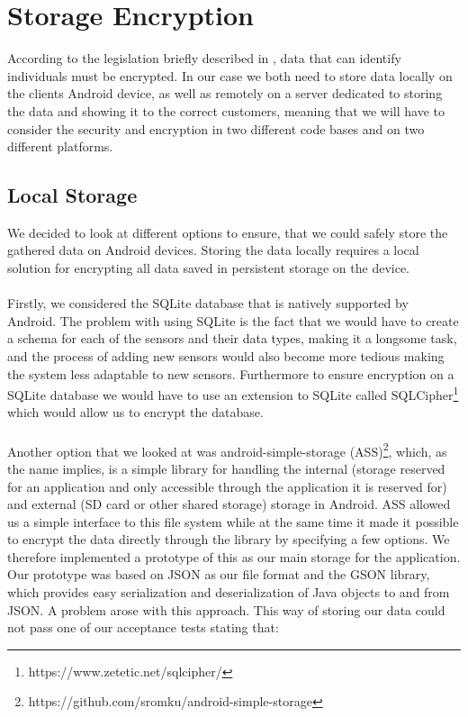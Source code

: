 
\section{Storage Encryption}
\label{sec:storage_encryption}
According to the legislation briefly described in , data that can identify individuals must be encrypted. In our case we both need to store data locally on the clients Android device, as well as remotely on a server dedicated to storing the data and showing it to the correct customers, meaning that we will have to consider the security and encryption in two different code bases and on two different platforms. 

\subsection{Local Storage}
\label{sub:local_storage}
We decided to look at different options to ensure, that we could safely store the gathered data on Android devices. Storing the data locally requires a local solution for encrypting all data saved in persistent storage on the device. 
\\\\
Firstly, we considered the SQLite database that is natively supported by Android. The problem with using SQLite is the fact that we would have to create a schema for each of the sensors and their data types, making it a longsome task, and the process of adding new sensors would also become more tedious making the system less adaptable to new sensors. Furthermore to ensure encryption on a SQLite database we would have to use an extension to SQLite called SQLCipher\footnote{https://www.zetetic.net/sqlcipher/} which would allow us to encrypt the database. 
\\\\
Another option that we looked at was android-simple-storage (ASS)\footnote{https://github.com/sromku/android-simple-storage}, which, as the name implies, is a simple library for handling the internal (storage reserved for an application and only accessible through the application it is reserved for) and external (SD card or other shared storage) storage in Android. ASS allowed us a simple interface to this file system while at the same time it made it possible to encrypt the data directly through the library by specifying a few options. We therefore implemented a prototype of this as our main storage for the application. Our prototype was based on JSON as our file format and the GSON library, which provides easy serialization and deserialization of Java objects to and from JSON. A problem arose with this approach. This way of storing our data could not pass one of our acceptance tests stating that:

